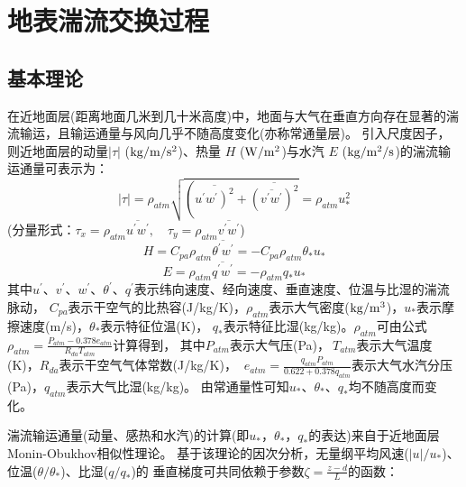 \chapter{地表湍流交换过程}

\section{基本理论}\label{基本理论}
在近地面层(距离地面几米到几十米高度)中，地面与大气在垂直方向存在显著的湍流输运，且输运通量与风向几乎不随高度变化(亦称常通量层)。
引入尺度因子，则近地面层的动量$\left|\tau\right|$ ($\rm kg/m/s^2$)、热量 $H$ ($\rm W/m^2$)与水汽 $E$ ($\rm kg/m^2/s$)的湍流输运通量可表示为：
\begin{equation}
|\tau|=\rho_{atm} \sqrt{\left(\overline{\left.u^{\prime} w^{\prime}\right)^{2}}+\overline{\left(\overline{v^{\prime} w^{\prime}}\right)^{2}}\right.}=\rho_{atm} u_{*}^{2}
\end{equation}
(分量形式：$\tau_{x}=\rho_{atm} \overline{u^{\prime} w^{\prime}}, \quad \tau_{y}=\rho_{atm} \overline{v^{\prime} w^{\prime}}$)
\begin{equation}
H=C_{p a} \rho_{atm} \overline{\theta^{\prime} w^{\prime}}=-C_{p a} \rho_{atm} \theta_{*} u_{*}
\end{equation}
\begin{equation}
E=\rho_{atm} \overline{q^{\prime} w^{\prime}}=-\rho_{atm} q_{*} u_{*}
\end{equation}
其中$u^\prime$、$v^\prime$、$w^\prime$、$\theta^\prime$、$q^\prime$表示纬向速度、经向速度、垂直速度、位温与比湿的湍流脉动，
$C_{pa}$表示干空气的比热容(J/kg/K)，$\rho_{atm}$表示大气密度($\rm kg/m^3$)，$u_\ast$表示摩擦速度(m/s)，$\theta_\ast$表示特征位温(K)，
$q_\ast$表示特征比湿(kg/kg)。$\rho_{atm}$可由公式$\rho_{atm}=\frac{P_{atm}-0.378e_{atm}}{R_{da}T_{atm}}$计算得到，
其中$P_{atm}$表示大气压(Pa)，$\ T_{atm}$表示大气温度(K)，$R_{da}$表示干空气气体常数(J/kg/K)，
$\ e_{atm}=\frac{q_{atm}P_{atm}}{0.622+0.378q_{atm}}$表示大气水汽分压(Pa)，$q_{atm}$表示大气比湿(kg/kg)。
由常通量性可知$u_\ast$、$\theta_\ast$、$q_\ast$均不随高度而变化。


湍流输运通量(动量、感热和水汽)的计算(即$u_\ast$，$\theta_\ast$，$q_\ast$的表达)来自于近地面层Monin-Obukhov相似性理论。
基于该理论的因次分析，无量纲平均风速($\left|u\right|/u_\ast$)、位温($\theta/\theta_\ast$)、比湿($q/q_\ast$)的
垂直梯度可共同依赖于参数$\zeta=\frac{z-d}{L}$的函数：

